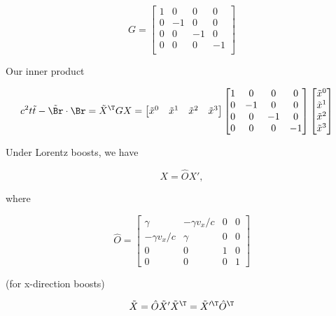 \begin{equation}\label{eqn:relativisticElectrodynamicsL6:60}
G = 
\begin{bmatrix}
1 & 0 & 0 & 0 \\
0 & -1 & 0 & 0 \\
0 & 0 & -1 & 0 \\
0 & 0 & 0 & -1 \\
\end{bmatrix}
\end{equation}

Our inner product 

\begin{align*}
c^2 t \tilde{t} - \tilde{\Br} \cdot \Br = \tilde{X}^\T G X 
&=
\begin{bmatrix}
\tilde{x}^0 & \tilde{x}^1 & \tilde{x}^2 & \tilde{x}^3 
\end{bmatrix}
\begin{bmatrix}
1 & 0 & 0 & 0 \\
0 & -1 & 0 & 0 \\
0 & 0 & -1 & 0 \\
0 & 0 & 0 & -1 \\
\end{bmatrix}
\begin{bmatrix}
\tilde{x}^0 \\
\tilde{x}^1 \\
\tilde{x}^2 \\
\tilde{x}^3 \\
\end{bmatrix}
\end{align*}

Under Lorentz boosts, we have

\begin{equation}\label{eqn:relativisticElectrodynamicsL6:70}
X = \hat{O} X',
\end{equation}

where 

\begin{equation}\label{eqn:relativisticElectrodynamicsL6:80}
\hat{O} =
\begin{bmatrix}
\gamma & - \gamma v_x/c  & 0 & 0 \\
- \gamma v_x/c & \gamma  & 0 & 0 \\
0 & 0 & 1 & 0 \\
0 & 0 & 0 & 1 
\end{bmatrix}
\end{equation}

(for x-direction boosts)

\begin{equation}\label{eqn:relativisticElectrodynamicsL6:90}
\tilde{X} = \hat{O} \tilde{X}'
\tilde{X}^\T = \tilde{X}'^\T \hat{O}^\T
\end{equation}

